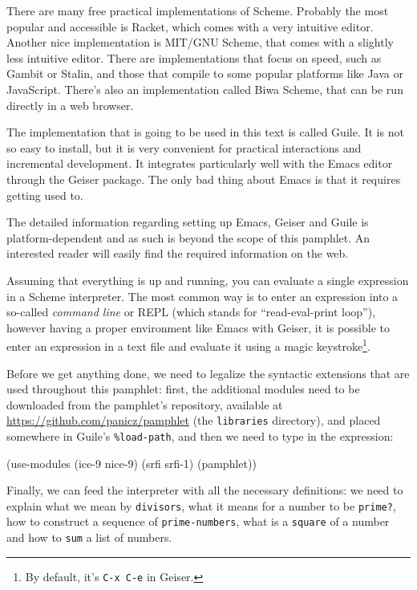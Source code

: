 There are many free practical implementations of Scheme. Probably
the most popular and accessible is Racket, which comes with
a very intuitive editor. Another nice implementation is
MIT/GNU Scheme, that comes with a slightly less intuitive editor.
There are implementations that focus on speed, such as Gambit
or Stalin, and those that compile to some popular platforms like Java
or JavaScript. There's also an implementation called Biwa Scheme,
that can be run directly in a web browser.

The implementation that is going to be used in this text is
called Guile. It is not so easy to install, but it is very
convenient for practical interactions and incremental development.
It integrates particularly well with the Emacs editor through
the Geiser package. The only bad thing about Emacs is that it requires
getting used to.

The detailed information regarding setting up Emacs, Geiser and Guile
is platform-dependent and as such is beyond the scope of this pamphlet.
An interested reader will easily find the required information on the
web.

Assuming that everything is up and running, you can evaluate
a single expression in a Scheme interpreter. The most common way
is to enter an expression into a so-called \textit{command line}
or REPL (which stands for ``read-eval-print loop''), however
having a proper environment like Emacs with Geiser, it is possible
to enter an expression in a text file and evaluate it using
a magic keystroke\footnote{By default, it's \texttt{C-x C-e}
in Geiser.}.

Before we get anything done, we need to legalize the syntactic
extensions that are used throughout this pamphlet: first, the
additional modules need to be downloaded from the pamphlet's
repository, available at \url{https://github.com/panicz/pamphlet}
(the \texttt{libraries} directory), and placed somewhere
in Guile's \texttt{\%load-path}, and then we need to type in
the expression:
\begin{Snippet}
(use-modules (ice-9 nice-9) (srfi srfi-1) (pamphlet))
\end{Snippet}

Finally, we can feed the interpreter with all the necessary
definitions: we need to explain what we mean by \texttt{divisors},
what it means for a number to be \texttt{prime?}, how to construct
a sequence of \texttt{prime-numbers}, what is a \texttt{square}
of a number and how to \texttt{sum} a list of numbers.

